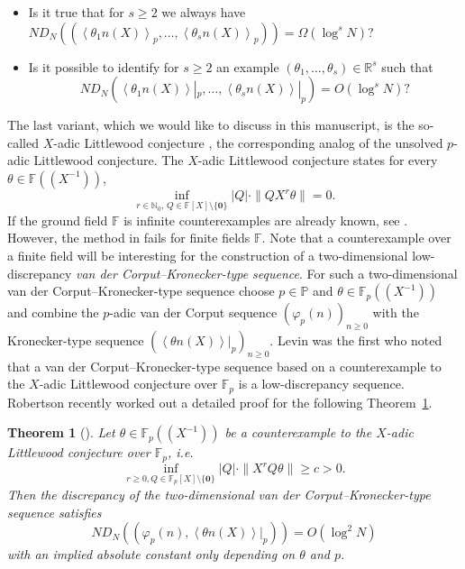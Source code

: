 \documentclass{article}
\newcommand{\NN}{\mathbb N}
\newcommand{\RR}{\mathbb R}
\newcommand{\PP}{\mathbb P}
\newcommand{\FF}{\mathbb{F}}
\renewcommand{\(}{\left (}
\renewcommand{\)}{\right )}
\newtheorem{theorem}{Theorem}[section]
\theoremstyle{definition}
\numberwithin{equation}{section}
\begin{document}
	\begin{itemize}
		\item Is it true that for $s\geq 2$ we always have $ND_N((\left<  \theta_1 n(X)\right>_p,\ldots,\left<  \theta_s n(X)\right>_p))=\Omega(\log^s N ) $?
		\item Is it possible to identify for $s\geq 2$ an example $(\theta_1,\ldots,\theta_s)\in\RR^s$ such that
		$$ND_N(\left<  \theta_1 n(X)\right>|_p,\ldots,\left<  \theta_s n(X)\right>|_p)=O(\log^s N)  ?$$
\end{itemize}

The last variant, which we would like to discuss in this manuscript, is the so-called $X$-adic Littlewood conjecture \cite{MatTeu2004}, the corresponding analog of the unsolved $p$-adic Littlewood conjecture. %
The $X$-adic Littlewood conjecture states for every $\theta \in \FF((X^{-1}))$, 
$$\inf_{r\in\NN_0,\,Q\in\FF[X]\setminus\{\boldsymbol{0}\}} |Q| \cdot\|QX^r\theta\|=0.$$
If the ground field $\FF$ is infinite counterexamples are already known, see \cite[Th\'{e}or\`eme~4.3]{MatTeu2004}. However, the method in \cite{MatTeu2004} fails for finite fields $\FF$. Note that a counterexample over a finite field will be interesting for the construction of a two-dimensional low-discrepancy \emph{van der Corput--Kronecker-type sequence}. For such a two-dimensional van der Corput--Kronecker-type sequence choose $p\in\PP$ and $\theta\in\FF_p((X^{-1}))$ and combine the $p$-adic van der Corput sequence $(\varphi_p(n))_{n\geq 0}$ with the Kronecker-type sequence $(\left<  \theta n(X)\right>|_p)_{n\geq 0}$. Levin \cite{levinLDhybrid} was the first who noted that a van der Corput--Kronecker-type sequence based on a counterexample to the $X$-adic Littlewood conjecture over $\FF_p$ is a low-discrepancy sequence. 
Robertson \cite{Robertson} recently worked out a detailed proof for the following Theorem~\ref{thm:upperbound}. 




\begin{theorem}[\cite{Robertson}]\label{thm:upperbound}
	Let $\theta\in\FF_p((X^{-1}))$ be a counterexample to the $X$-adic Littlewood conjecture over $\FF_p$, i.e. $$\inf_{r\geq 0,Q\in\FF_p[X]\setminus\{\boldsymbol{0}\}} |Q| \cdot\|X^rQ\theta\|\geq c>0.$$ 
	Then the discrepancy of the two-dimensional van der Corput--Kronecker-type sequence satisfies $$N D_N((\varphi_p(n),{\left<  \theta n(X)\right>}|_p ))=O(\log^2 N)$$ with an implied absolute constant only depending on $\theta$ and $p$. 
\end{theorem}
\end{document}
